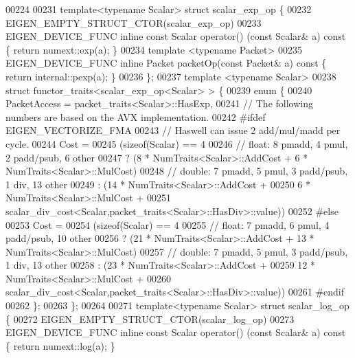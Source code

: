 \begin{DoxyCode}
00224 
00231 \textcolor{keyword}{template}<\textcolor{keyword}{typename} Scalar> \textcolor{keyword}{struct }scalar\_exp\_op \{
00232   EIGEN\_EMPTY\_STRUCT\_CTOR(scalar\_exp\_op)
00233   EIGEN\_DEVICE\_FUNC \textcolor{keyword}{inline} \textcolor{keyword}{const} Scalar operator() (\textcolor{keyword}{const} Scalar& a)\textcolor{keyword}{ const }\{ \textcolor{keywordflow}{return} numext::exp(a); \}
00234   \textcolor{keyword}{template} <\textcolor{keyword}{typename} Packet>
00235   EIGEN\_DEVICE\_FUNC \textcolor{keyword}{inline} Packet packetOp(\textcolor{keyword}{const} Packet& a)\textcolor{keyword}{ const }\{ \textcolor{keywordflow}{return} internal::pexp(a); \}
00236 \};
00237 \textcolor{keyword}{template} <\textcolor{keyword}{typename} Scalar>
00238 \textcolor{keyword}{struct }functor\_traits<scalar\_exp\_op<Scalar> > \{
00239   \textcolor{keyword}{enum} \{
00240     PacketAccess = packet\_traits<Scalar>::HasExp,
00241     \textcolor{comment}{// The following numbers are based on the AVX implementation.}
00242 \textcolor{preprocessor}{#ifdef EIGEN\_VECTORIZE\_FMA}
00243     \textcolor{comment}{// Haswell can issue 2 add/mul/madd per cycle.}
00244     Cost =
00245     (\textcolor{keyword}{sizeof}(Scalar) == 4
00246      \textcolor{comment}{// float: 8 pmadd, 4 pmul, 2 padd/psub, 6 other}
00247      ? (8 * NumTraits<Scalar>::AddCost + 6 * NumTraits<Scalar>::MulCost)
00248      \textcolor{comment}{// double: 7 pmadd, 5 pmul, 3 padd/psub, 1 div,  13 other}
00249      : (14 * NumTraits<Scalar>::AddCost +
00250         6 * NumTraits<Scalar>::MulCost +
00251         scalar\_div\_cost<Scalar,packet\_traits<Scalar>::HasDiv>::value))
00252 \textcolor{preprocessor}{#else}
00253     Cost =
00254     (\textcolor{keyword}{sizeof}(Scalar) == 4
00255      \textcolor{comment}{// float: 7 pmadd, 6 pmul, 4 padd/psub, 10 other}
00256      ? (21 * NumTraits<Scalar>::AddCost + 13 * NumTraits<Scalar>::MulCost)
00257      \textcolor{comment}{// double: 7 pmadd, 5 pmul, 3 padd/psub, 1 div,  13 other}
00258      : (23 * NumTraits<Scalar>::AddCost +
00259         12 * NumTraits<Scalar>::MulCost +
00260         scalar\_div\_cost<Scalar,packet\_traits<Scalar>::HasDiv>::value))
00261 \textcolor{preprocessor}{#endif}
00262   \};
00263 \};
00264 
00271 \textcolor{keyword}{template}<\textcolor{keyword}{typename} Scalar> \textcolor{keyword}{struct }scalar\_log\_op \{
00272   EIGEN\_EMPTY\_STRUCT\_CTOR(scalar\_log\_op)
00273   EIGEN\_DEVICE\_FUNC \textcolor{keyword}{inline} \textcolor{keyword}{const} Scalar operator() (\textcolor{keyword}{const} Scalar& a)\textcolor{keyword}{ const }\{ \textcolor{keywordflow}{return} numext::log(a); \}

\end{DoxyCode}
